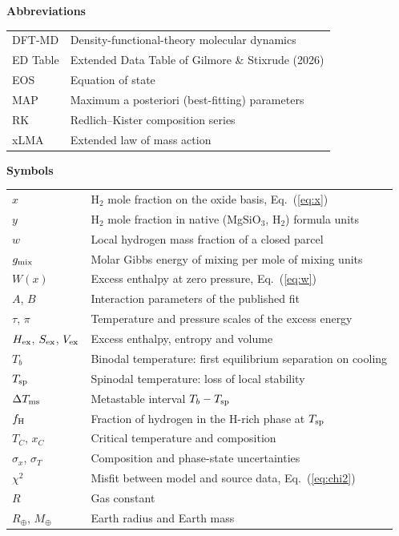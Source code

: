 {\noindent\bfseries\large Abbreviations\par}\vspace{8pt}
\noindent\begin{tabular}{@{}p{2.2cm}l@{}}
DFT-MD & Density-functional-theory molecular dynamics\\
ED Table & Extended Data Table of Gilmore \& Stixrude (2026)\\
EOS & Equation of state\\
MAP & Maximum a posteriori (best-fitting) parameters\\
RK & Redlich--Kister composition series\\
xLMA & Extended law of mass action\\
\end{tabular}

\vspace{18pt}
{\noindent\bfseries\large Symbols\par}\vspace{8pt}
\noindent\begin{tabular}{@{}p{2.2cm}l@{}}
$x$ & H$_2$ mole fraction on the oxide basis, Eq.~(\ref{eq:x})\\
$y$ & H$_2$ mole fraction in native (MgSiO$_3$, H$_2$) formula units\\
$w$ & Local hydrogen mass fraction of a closed parcel\\
$g_{\rm mix}$ & Molar Gibbs energy of mixing per mole of mixing units\\
$W(x)$ & Excess enthalpy at zero pressure, Eq.~(\ref{eq:w})\\
$A$, $B$ & Interaction parameters of the published fit\\
$\tau$, $\pi$ & Temperature and pressure scales of the excess energy\\
$H_{\rm ex}$, $S_{\rm ex}$, $V_{\rm ex}$ & Excess enthalpy, entropy and volume\\
$T_b$ & Binodal temperature: first equilibrium separation on cooling\\
$T_{\rm sp}$ & Spinodal temperature: loss of local stability\\
$\Delta T_{\rm ms}$ & Metastable interval $T_b - T_{\rm sp}$\\
$f_{\rm H}$ & Fraction of hydrogen in the H-rich phase at $T_{\rm sp}$\\
$T_C$, $x_C$ & Critical temperature and composition\\
$\sigma_x$, $\sigma_T$ & Composition and phase-state uncertainties\\
$\chi^2$ & Misfit between model and source data, Eq.~(\ref{eq:chi2})\\
$R$ & Gas constant\\
$R_\oplus$, $M_\oplus$ & Earth radius and Earth mass\\
\end{tabular}
